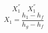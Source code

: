 

\item[c)] 
    \[
    X_{1}^{''} \quad X_{1}^{''}
    \]
    \[
    X_{1} = \frac{h_{1} - h_{f}}{h_{g} - h_{f}}
    \]